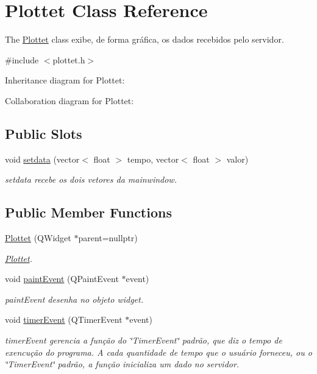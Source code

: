 \hypertarget{classPlottet}{}\section{Plottet Class Reference}
\label{classPlottet}


The \hyperlink{classPlottet}{Plottet} class exibe, de forma gráfica, os dados recebidos pelo servidor.  




{\ttfamily \#include $<$plottet.\+h$>$}



Inheritance diagram for Plottet\+:


Collaboration diagram for Plottet\+:
\subsection*{Public Slots}
\begin{DoxyCompactItemize}
\item 
void \hyperlink{classPlottet_a7016967c746c5ed5577402bf338e9009}{setdata} (vector$<$ float $>$ tempo, vector$<$ float $>$ valor)
\begin{DoxyCompactList}\small\item\em setdata recebe os dois vetores da mainwindow. \end{DoxyCompactList}\end{DoxyCompactItemize}
\subsection*{Public Member Functions}
\begin{DoxyCompactItemize}
\item 
\hyperlink{classPlottet_af5cf596a782541bb858d5b006e3192ed}{Plottet} (Q\+Widget $\ast$parent=nullptr)
\begin{DoxyCompactList}\small\item\em \hyperlink{classPlottet}{Plottet}. \end{DoxyCompactList}\item 
void \hyperlink{classPlottet_aed7fa997b5a5428820741d12040e0951}{paint\+Event} (Q\+Paint\+Event $\ast$event)
\begin{DoxyCompactList}\small\item\em paint\+Event desenha no objeto widget. \end{DoxyCompactList}\item 
void \hyperlink{classPlottet_ab956470d24253af22b1ebe0e18523abf}{timer\+Event} (Q\+Timer\+Event $\ast$event)
\begin{DoxyCompactList}\small\item\em timer\+Event gerencia a função do \char`\"{}\+Timer\+Event\char`\"{} padrão, que diz o tempo de exencução do programa. A cada quantidade de tempo que o usuário forneceu, ou o \char`\"{}\+Timer\+Event\char`\"{} padrão, a função inicializa um dado no servidor. \end{DoxyCompactList}\end{DoxyCompactItemize}



